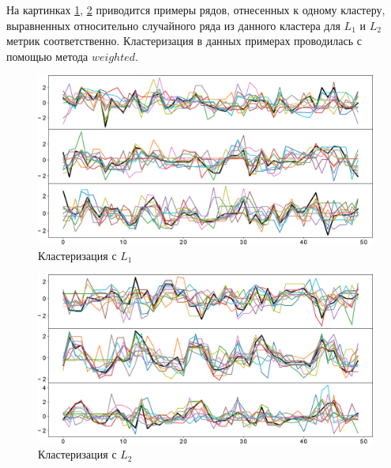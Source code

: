 \documentclass[12pt,twoside]{article}
\begin{document}
    На картинках \ref{img1}, \ref{img2} приводится примеры рядов, отнесенных к одному кластеру,
        выравненных относительно случайного ряда из данного кластера для $L_1$ и $L_2$ метрик соответственно.
    Кластеризация в данных примерах проводилась с помощью метода $weighted$.

    \begin{figure}[h]
        \includegraphics[width=\textwidth]{images/img2.eps}
        \caption{Кластеризация с $L_1$} \label{img1}
    \end{figure}
    \begin{figure}[h!]
        \includegraphics[width=\textwidth]{images/img3.eps}
        \caption{Кластеризация с $L_2$} \label{img2}
    \end{figure}                

     
    
    
\end{document}
